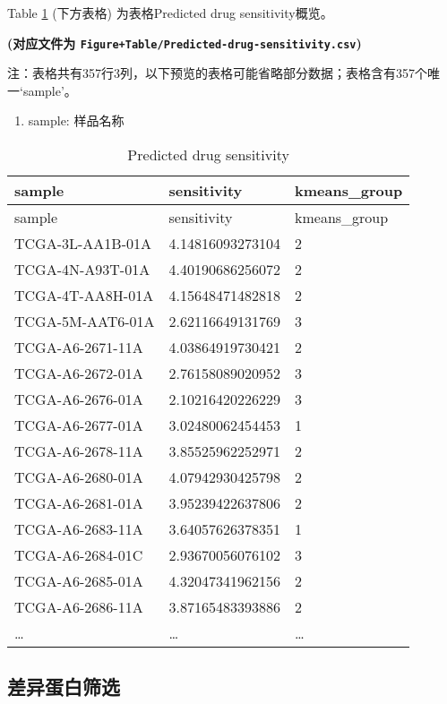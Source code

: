 \documentclass[
]{article}
\providecommand{\tightlist}{%
  \setlength{\itemsep}{0pt}\setlength{\parskip}{0pt}}
\begin{document}
Table \ref{tab:Predicted-drug-sensitivity} (下方表格) 为表格Predicted drug sensitivity概览。

\textbf{(对应文件为 \texttt{Figure+Table/Predicted-drug-sensitivity.csv})}

\begin{center}\begin{tcolorbox}[colback=gray!10, colframe=gray!50, width=0.9\linewidth, arc=1mm, boxrule=0.5pt]注：表格共有357行3列，以下预览的表格可能省略部分数据；表格含有357个唯一`sample'。
\end{tcolorbox}
\end{center}
\begin{center}\begin{tcolorbox}[colback=gray!10, colframe=gray!50, width=0.9\linewidth, arc=1mm, boxrule=0.5pt]\begin{enumerate}\tightlist
\item sample:  样品名称
\end{enumerate}\end{tcolorbox}
\end{center}

\begin{longtable}[]{@{}lll@{}}
\caption{\label{tab:Predicted-drug-sensitivity}Predicted drug sensitivity}\tabularnewline
\toprule
sample & sensitivity & kmeans\_group\tabularnewline
\midrule
\endfirsthead
\toprule
sample & sensitivity & kmeans\_group\tabularnewline
\midrule
\endhead
TCGA-3L-AA1B-01A & 4.14816093273104 & 2\tabularnewline
TCGA-4N-A93T-01A & 4.40190686256072 & 2\tabularnewline
TCGA-4T-AA8H-01A & 4.15648471482818 & 2\tabularnewline
TCGA-5M-AAT6-01A & 2.62116649131769 & 3\tabularnewline
TCGA-A6-2671-11A & 4.03864919730421 & 2\tabularnewline
TCGA-A6-2672-01A & 2.76158089020952 & 3\tabularnewline
TCGA-A6-2676-01A & 2.10216420226229 & 3\tabularnewline
TCGA-A6-2677-01A & 3.02480062454453 & 1\tabularnewline
TCGA-A6-2678-11A & 3.85525962252971 & 2\tabularnewline
TCGA-A6-2680-01A & 4.07942930425798 & 2\tabularnewline
TCGA-A6-2681-01A & 3.95239422637806 & 2\tabularnewline
TCGA-A6-2683-11A & 3.64057626378351 & 1\tabularnewline
TCGA-A6-2684-01C & 2.93670056076102 & 3\tabularnewline
TCGA-A6-2685-01A & 4.32047341962156 & 2\tabularnewline
TCGA-A6-2686-11A & 3.87165483393886 & 2\tabularnewline
\ldots{} & \ldots{} & \ldots{}\tabularnewline
\bottomrule
\end{longtable}

\hypertarget{ux5deeux5f02ux86cbux767dux7b5bux9009}{%
\subsection{差异蛋白筛选}\label{ux5deeux5f02ux86cbux767dux7b5bux9009}}
\end{document}

